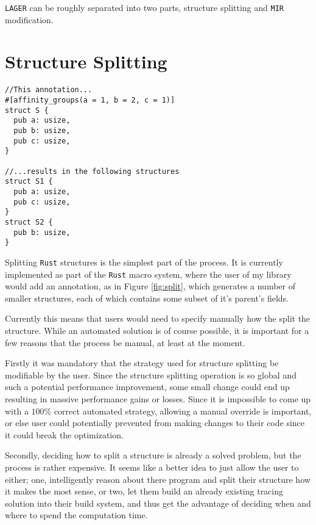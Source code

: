 \documentclass[12pt,oneside]{book}
\newcommand{\rustname}{{\texttt{Rust}}}
\def \rust {\rustname{}\xspace}
\newcommand{\mirname}{{\texttt{MIR}}}
\def \mir {\mirname{}\xspace}
\newcommand{\projectname}{{\texttt{LAGER}}}
\def \name{\projectname\xspace}
\begin{document}
\name can be roughly separated into two parts, structure splitting and
\mir modification.

\section{Structure Splitting}

\begin{figure*}
\begin{verbatim}
//This annotation...
#[affinity_groups(a = 1, b = 2, c = 1)]
struct S {
  pub a: usize,
  pub b: usize,
  pub c: usize,
}

//...results in the following structures
struct S1 {
  pub a: usize,
  pub c: usize,
}
struct S2 {
  pub b: usize,
}
\end{verbatim}
  \caption{Structure Splitting as a macro}
  \label{fig:split}
\end{figure*}

Splitting \rust structures is the simplest part of the process. It is currently
implemented as part of the \rust macro system, where the user of my library
would add an annotation, as in Figure \ref{fig:split}, which generates a number
of smaller structures, each of which contains some subset of it's parent's fields.

Currently this means
that users would need to specify manually how the split the structure. While an
automated solution is of course possible, it is important for a few reasons that
the process be manual, at least at the moment. 

Firstly it was mandatory that the strategy used for structure splitting be modifiable by the user.
Since the structure splitting operation is so global and such a potential performance improvement,
some small change could end up resulting in massive performance gains or losses. Since it is impossible
to come up with a $100\%$ correct automated strategy, allowing a manual override is important, or else
user could potentially prevented from making changes to their code
since it could break the optimization.

Secondly, deciding how to split a structure is already a solved problem,
but the process is rather expensive. It seems like a better idea to just allow the user to either; one, 
intelligently reason about there program and split their structure how it makes the most sense, or two, 
let them build an already existing tracing solution into their build system, and thus get the advantage
of deciding when and where to spend the computation time.
\end{document}

